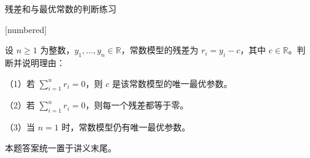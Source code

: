 \documentclass[aspectratio=169,10pt,fontset=fandol]{ctexbeamer}
\makeatletter
\newcommand{\mathagentexerciselabelcontext}[1]{%
\hypertarget<1>{#1}{}%
\edef\@currentHref{#1}%
}
\makeatother
\begin{document}
\begin{frame}[t,fragile]{残差和与最优常数的判断练习}
\normalsize
{\normalsize
[numbered]
\mathagentexerciselabelcontext{mathagent.exercise.U0015.0}
\begin{exercise}
\label{mathagent:exercise:9e7dbf7ef17df1506f236bbf1ad6ff8c14ff13065df89e12b796d18475228be7}
设 $n\geq1$ 为整数，$y_1,\ldots,y_n\in\mathbb{R}$，常数模型的残差为 $r_i=y_i-c$，其中 $c\in\mathbb{R}$。判断并说明理由：

（1）若 $\sum_{i=1}^{n}r_i=0$，则 $c$ 是该常数模型的唯一最优参数。

（2）若 $\sum_{i=1}^{n}r_i=0$，则每一个残差都等于零。

（3）当 $n=1$ 时，常数模型仍有唯一最优参数。

本题答案统一置于讲义末尾。
\end{exercise}
}
\end{frame}
\end{document}
